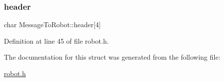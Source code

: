 \subsubsection{\texorpdfstring{header}{header}}
{\footnotesize\ttfamily char Message\+To\+Robot\+::header\mbox{[}4\mbox{]}}



Definition at line 45 of file robot.\+h.



The documentation for this struct was generated from the following file\+:\begin{DoxyCompactItemize}
\item 
\hyperlink{robot_8h}{robot.\+h}\end{DoxyCompactItemize}
